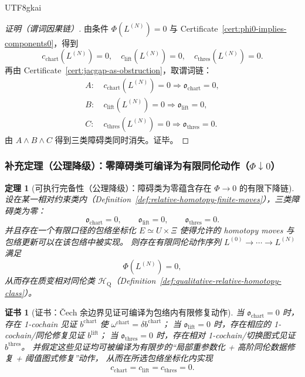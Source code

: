 \documentclass[12pt]{article}
\newtheorem{theorem}{定理}[section]
\newtheorem{certificate}{证书}[section]
\begin{document}
\begin{CJK*}{UTF8}{gkai}
\begin{proof}[证明（谓词因果链）]
由条件 $\Phi(L^{(N)})=0$ 与 Certificate~\ref{cert:phi0-implies-components0}，得到
\[
c_{\mathrm{chart}}(L^{(N)})=0,\quad c_{\mathrm{lift}}(L^{(N)})=0,\quad c_{\mathrm{thres}}(L^{(N)})=0.
\]
再由 Certificate~\ref{cert:jacgap-as-obstruction}，取谓词链：
\[
\begin{aligned}
A:&\ c_{\mathrm{chart}}(L^{(N)})=0\Rightarrow \mathfrak{o}_{\mathrm{chart}}=0,\\
B:&\ c_{\mathrm{lift}}(L^{(N)})=0\Rightarrow \mathfrak{o}_{\mathrm{lift}}=0,\\
C:&\ c_{\mathrm{thres}}(L^{(N)})=0\Rightarrow \mathfrak{o}_{\mathrm{thres}}=0.
\end{aligned}
\]
由 $A\wedge B\wedge C$ 得到三类障碍类同时消失。证毕。
\end{proof}

\subsubsection{补充定理（公理降级）：零障碍类可编译为有限同伦动作（$\Phi\downarrow 0$）}

\begin{theorem}[可执行完备性（公理降级）：障碍类为零蕴含存在 $\Phi\to 0$ 的有限下降链]
\label{thm:obstruction-zero-implies-finite-descent}
设在某一相对约束类内（Definition~\ref{def:relative-homotopy-finite-moves}），三类障碍类为零：
\[
\mathfrak{o}_{\mathrm{chart}}=0,\qquad
\mathfrak{o}_{\mathrm{lift}}=0,\qquad
\mathfrak{o}_{\mathrm{thres}}=0.
\]
并且存在一个有限口径的包络坐标化 $E\simeq U\times\Xi$ 使得允许的 homotopy moves 与包络更新可以在该包络中被实现。
则存在有限同伦动作序列 $L^{(0)}\to\cdots\to L^{(N)}$ 满足
\[
\Phi(L^{(N)})=0,
\]
从而存在质变相对同伦类 $\mathcal{H}_{\mathrm{Q}}$（Definition~\ref{def:qualitative-relative-homotopy-class}）。
\end{theorem}

\begin{certificate}[证书：Čech 余边界见证可编译为包络内有限修复动作]
\label{cert:obstruction-zero-compilable}
当 $\mathfrak{o}_{\mathrm{chart}}=0$ 时，存在 1-cochain 见证 $b^{\mathrm{chart}}$ 使 $\omega^{\mathrm{chart}}=\delta
  b^{\mathrm{chart}}$；
当 $\mathfrak{o}_{\mathrm{lift}}=0$ 时，存在相应的 1-cochain/同伦修复见证 $b^{\mathrm{lift}}$；
当 $\mathfrak{o}_{\mathrm{thres}}=0$ 时，存在相对 1-cochain/切换图式见证 $b^{\mathrm{thres}}$。
并假定这些见证均可被编译为有限步的“局部重参数化 + 高阶同伦数据修复 + 阈值图式修复”动作，
从而在所选包络坐标化内实现
\[
c_{\mathrm{chart}}=c_{\mathrm{lift}}=c_{\mathrm{thres}}=0.
\]
\end{certificate}


\end{CJK*}
\end{document}

